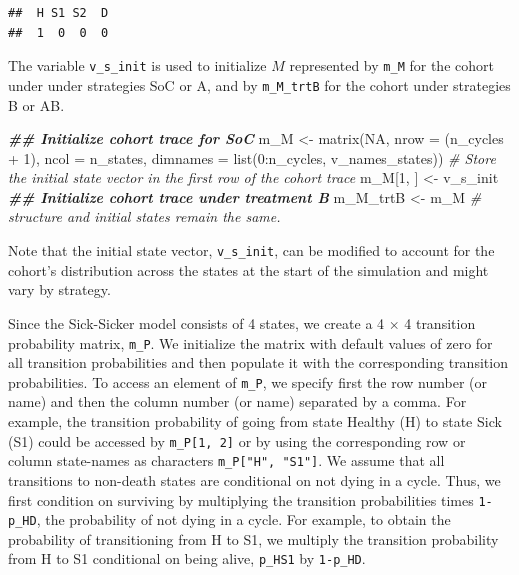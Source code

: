 \documentclass[
]{article}
\newenvironment{Shaded}{\begin{snugshade}}{\end{snugshade}}
\newcommand{\AttributeTok}[1]{\textcolor[rgb]{0.77,0.63,0.00}{#1}}
\newcommand{\CommentTok}[1]{\textcolor[rgb]{0.56,0.35,0.01}{\textit{#1}}}
\newcommand{\ConstantTok}[1]{\textcolor[rgb]{0.00,0.00,0.00}{#1}}
\newcommand{\DecValTok}[1]{\textcolor[rgb]{0.00,0.00,0.81}{#1}}
\newcommand{\DocumentationTok}[1]{\textcolor[rgb]{0.56,0.35,0.01}{\textbf{\textit{#1}}}}
\newcommand{\FunctionTok}[1]{\textcolor[rgb]{0.00,0.00,0.00}{#1}}
\newcommand{\NormalTok}[1]{#1}
\newcommand{\OtherTok}[1]{\textcolor[rgb]{0.56,0.35,0.01}{#1}}
\newcommand{\SpecialCharTok}[1]{\textcolor[rgb]{0.00,0.00,0.00}{#1}}
\begin{document}
\begin{verbatim}
##  H S1 S2  D 
##  1  0  0  0
\end{verbatim}

The variable \texttt{v\_s\_init} is used to initialize \(M\) represented by \texttt{m\_M} for the cohort under under strategies SoC or A, and by \texttt{m\_M\_trtB} for the cohort under strategies B or AB.

\begin{Shaded}
\begin{Highlighting}[]
\DocumentationTok{\#\# Initialize cohort trace for SoC}
\NormalTok{m\_M }\OtherTok{\textless{}{-}} \FunctionTok{matrix}\NormalTok{(}\ConstantTok{NA}\NormalTok{, }
              \AttributeTok{nrow =}\NormalTok{ (n\_cycles }\SpecialCharTok{+} \DecValTok{1}\NormalTok{), }\AttributeTok{ncol =}\NormalTok{ n\_states, }
              \AttributeTok{dimnames =} \FunctionTok{list}\NormalTok{(}\DecValTok{0}\SpecialCharTok{:}\NormalTok{n\_cycles, v\_names\_states))}
\CommentTok{\# Store the initial state vector in the first row of the cohort trace}
\NormalTok{m\_M[}\DecValTok{1}\NormalTok{, ] }\OtherTok{\textless{}{-}}\NormalTok{ v\_s\_init}
\DocumentationTok{\#\# Initialize cohort trace under treatment B}
\NormalTok{m\_M\_trtB }\OtherTok{\textless{}{-}}\NormalTok{ m\_M }\CommentTok{\# structure and initial states remain the same.}
\end{Highlighting}
\end{Shaded}

Note that the initial state vector, \texttt{v\_s\_init}, can be modified to account for the cohort's distribution across the states at the start of the simulation and might vary by strategy.

Since the Sick-Sicker model consists of 4 states, we create a 4 \(\times\) 4 transition probability matrix, \texttt{m\_P}. We initialize the matrix with default values of zero for all transition probabilities and then populate it with the corresponding transition probabilities. To access an element of \texttt{m\_P}, we specify first the row number (or name) and then the column number (or name) separated by a comma. For example, the transition probability of going from state Healthy (H) to state Sick (S1) could be accessed by \texttt{m\_P{[}1,\ 2{]}} or by using the corresponding row or column state-names as characters \texttt{m\_P{[}"H",\ "S1"{]}}. We assume that all transitions to non-death states are conditional on not dying in a cycle. Thus, we first condition on surviving by multiplying the transition probabilities times \texttt{1-p\_HD}, the probability of not dying in a cycle. For example, to obtain the probability of transitioning from H to S1, we multiply the transition probability from H to S1 conditional on being alive, \texttt{p\_HS1} by \texttt{1-p\_HD}.
\end{document}
